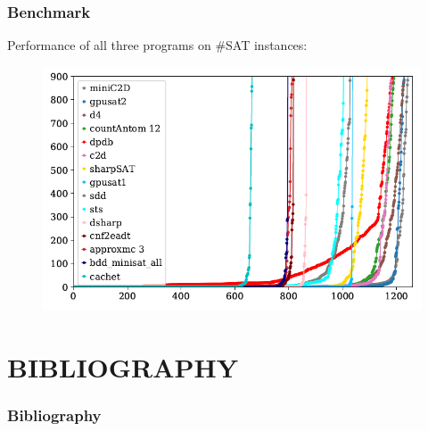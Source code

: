 \documentclass[c,8pt,xcolor...,x11names]{beamer}
\begin{document}
\begin{frame}
	\medskip
	\frametitle{Benchmark}
	{\color{blue}Performance of all three programs on \#SAT instances:} \medskip\\
	\begin{figure}
		\includegraphics[width=0.8\linewidth]{images/dpdbRuntime.png}
	\end{figure}
\end{frame}

\section{BIBLIOGRAPHY}
\begin{frame}
	\frametitle{Bibliography}
	\medskip
	
\end{frame}



\bgroup
{}
\begin{frame}[plain]{}
\end{frame}
\egroup
\end{document}
